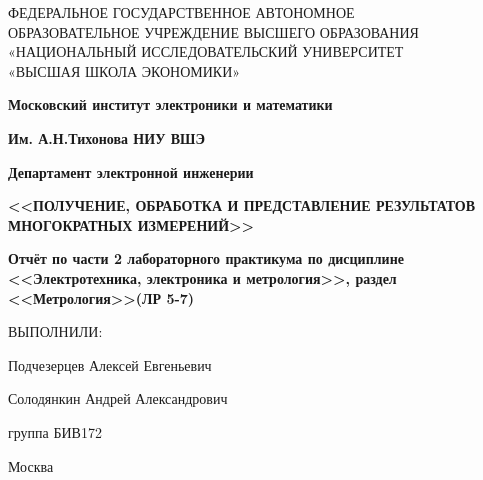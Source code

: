 \begin{titlepage}
	\begin{center}
		ФЕДЕРАЛЬНОЕ  ГОСУДАРСТВЕННОЕ АВТОНОМНОЕ \\
		ОБРАЗОВАТЕЛЬНОЕ УЧРЕЖДЕНИЕ ВЫСШЕГО ОБРАЗОВАНИЯ\\
		«НАЦИОНАЛЬНЫЙ ИССЛЕДОВАТЕЛЬСКИЙ УНИВЕРСИТЕТ\\
		«ВЫСШАЯ ШКОЛА ЭКОНОМИКИ»
	\end{center}
	
	\begin{center}
		\textbf{Московский институт электроники и математики}
		
		\textbf{Им. А.Н.Тихонова НИУ ВШЭ}
		
		\textbf{Департамент электронной инженерии}
	\end{center}	
	\vspace{5ex}
	\begin{center}
\textbf{<<ПОЛУЧЕНИЕ, ОБРАБОТКА И ПРЕДСТАВЛЕНИЕ РЕЗУЛЬТАТОВ МНОГОКРАТНЫХ ИЗМЕРЕНИЙ>>}
	\end{center}	
	\vspace{1ex}
	\begin{center}
\textbf{Отчёт по части 2 лабораторного практикума по дисциплине \\
	<<Электротехника, электроника и метрология>>, раздел <<Метрология>>(ЛР 5-7)}
	\end{center}	
	\vspace{5ex}
	
	\begin{multicols}{2}
	\vfill\null
	\columnbreak
	ВЫПОЛНИЛИ:
	
	Подчезерцев Алексей Евгеньевич
	
	Солодянкин Андрей Александрович
	
	группа БИВ172
	\end{multicols}

	\vfill
	\begin{center}
		Москва \the\year
	\end{center}
\end{titlepage}